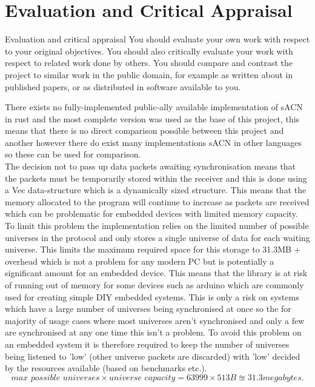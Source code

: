 \documentclass[11pt,a4paper]{report}
\begin{document}
\section{Evaluation and Critical Appraisal}
Evaluation and critical appraisal
You should evaluate your own work with respect to your original objectives. You should also critically evaluate your work with respect to related work done by others. You should compare and contrast the project to similar work in the public domain, for example as written about in published papers, or as distributed in software available to you.

There exists no fully-implemented public-ally available implementation of sACN in rust and the most complete version was used as the base of this project, this means that there is no direct comparison possible between this project and another however there do exist many implementations sACN in other languages so these can be used for comparison. \\


The decision not to pass up data packets awaiting synchronisation means that the packets must be temporarily stored within the receiver and this is done using a Vec data-structure which is a dynamically sized structure. This means that the memory allocated to the program will continue to increase as packets are received which can be problematic for embedded devices with limited memory capacity. To limit this problem the implementation relies on the limited number of possible universes in the protocol and only stores a single universe of data for each waiting universe. This limits the maximum required space for this storage to 31.3MB + overhead which is not a problem for any modern PC but is potentially a significant amount for an embedded device. This means that the library is at risk of running out of memory for some devices such as arduino \cite{ARDUINO} which are commonly used for creating simple DIY embedded systems. This is only a risk on systems which have a large number of universes being synchronised at once so the for majority of usage cases where most universes aren't synchronised and only a few are synchronised at any one time this isn't a problem. To avoid this problem on an embedded system it is therefore required to keep the number of universes being listened to 'low' (other universe packets are discarded) with 'low' decided by the resources available (based on benchmarks etc.).  
\[ 
\textit{max possible universes} \times \textit{universe capacity} = 63999 \times 513 B \approxeq 31.3 megabytes. 
\]
\end{document}
